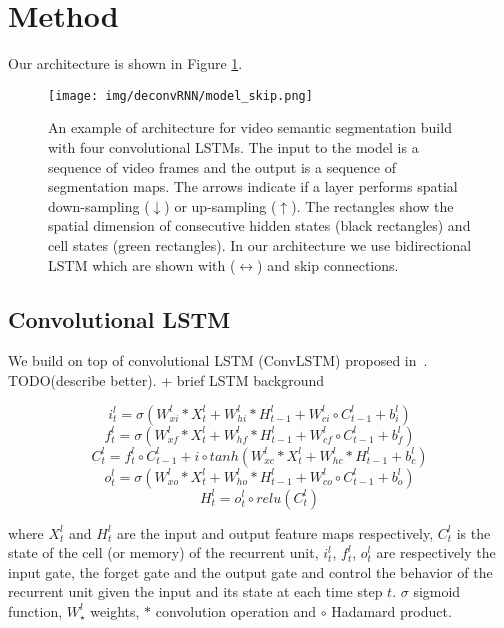 

\section{Method}

Our architecture is shown in Figure \ref{fig:method}.
\label{sec:method}
\begin{figure}
\centering
\texttt{[image: img/deconvRNN/model\_skip.png]}
\label{fig:method}
\caption{An example of architecture for video semantic segmentation build with
four convolutional LSTMs. The input to the model is a sequence of video frames
and the output is a sequence of segmentation maps. The arrows indicate if a
layer performs spatial down-sampling ($\downarrow$) or up-sampling
($\uparrow$). The rectangles show the spatial dimension of consecutive hidden
states (black rectangles) and cell states (green rectangles). In our
architecture we use bidirectional LSTM which are shown with ($\leftrightarrow$)
and skip connections.}
\end{figure}


\subsection{Convolutional LSTM}
We build on top of convolutional LSTM (ConvLSTM) proposed in~\cite{ShiCWYWW15}.
TODO(describe better). + brief LSTM background


\[ i_t^{l} = \sigma(W_{xi}^{l}*X_t^{l} + W_{hi}^{l}*H_{t-1}^{l} + W_{ci}^{l} \circ C_{t-1}^{l} + b_i^{l})\]
\[ f_t^{l} = \sigma(W_{xf}^{l}*X_t^{l} + W_{hf}^{l}*H_{t-1}^{l} + W_{cf}^{l} \circ C_{t-1}^{l} + b_f^{l})\]
\[ C_t^{l} = f_t^{l} \circ C_{t-1}^{l} + i \circ tanh(W_{xc}^{l}*X_t^{l} + W_{hc}^{l}*H_{t-1}^{l} + b_c^{l})\]
\[ o_t^{l} = \sigma(W_{xo}^{l}*X_t^{l} + W_{ho}^{l}*H_{t-1}^{l} + W_{co}^{l} \circ C_{t-1}^{l} + b_o^{l})\]
\[ H_t^{l} = o_t^{l} \circ relu(C_t^{l})\]

where \(X_t^{l}\) and \(H_t^{l}\) are the input and output feature maps
respectively, \(C_t^{l}\) is the state of the cell (or memory) of the recurrent
unit, \(i_t^{l}\), \(f_t^{l}\), \(o_t^{l}\) are respectively the input gate,
the forget gate and the output gate and control the behavior of the recurrent
unit given the input and its state at each time step $t$.
\(\sigma\) sigmoid function, \(W_{\star}^{l}\) weights, \(*\) convolution
operation and \(\circ\) Hadamard product.


